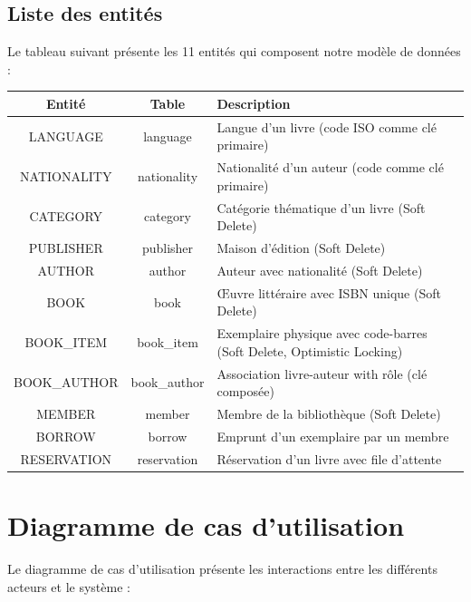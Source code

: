 \documentclass[12pt,a4paper,twoside]{report}
\begin{document}
\subsection{Liste des entités}

Le tableau suivant présente les 11 entités qui composent notre modèle de données :

\begin{longtable}{c c p{8cm}}
\hline
\rowcolor[gray]{0.9}
\textbf{Entité} & \textbf{Table} & \textbf{Description} \\
\hline
\endfirsthead
\hline
\endfoot
LANGUAGE & language & Langue d'un livre (code ISO comme clé primaire) \\
NATIONALITY & nationality & Nationalité d'un auteur (code comme clé primaire) \\
CATEGORY & category & Catégorie thématique d'un livre (Soft Delete) \\
PUBLISHER & publisher & Maison d'édition (Soft Delete) \\
AUTHOR & author & Auteur avec nationalité (Soft Delete) \\
BOOK & book & Œuvre littéraire avec ISBN unique (Soft Delete) \\
BOOK\_ITEM & book\_item & Exemplaire physique avec code-barres (Soft Delete, Optimistic Locking) \\
BOOK\_AUTHOR & book\_author & Association livre-auteur with rôle (clé composée) \\
MEMBER & member & Membre de la bibliothèque (Soft Delete) \\
BORROW & borrow & Emprunt d'un exemplaire par un membre \\
RESERVATION & reservation & Réservation d'un livre avec file d'attente \\
\hline
\end{longtable}

\section{Diagramme de cas d'utilisation}

Le diagramme de cas d'utilisation présente les interactions entre les différents acteurs et le système :
\end{document}
